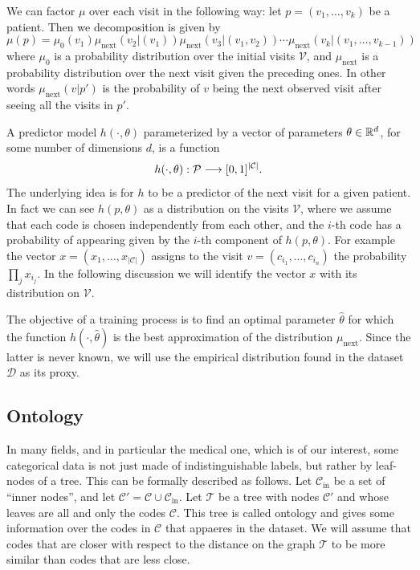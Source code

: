 \documentclass[]{marticle}
\newcommand{\ds}{\mathcal{D}}
\newcommand{\codes}{\mathcal{C}}
\newcommand{\codesin}{\mathcal{C}_\text{in}}
\newcommand{\tree }{\mathcal{T}}
\newcommand{\patients}{\mathcal{P}}
\newcommand{\visits}{\mathcal{V}}
\begin{document}
We can factor $\mu$ over each visit in the following way: let $p=(v_1, \dots, v_k)$ be a patient. Then
we decomposition is given by
$$ \mu(p) = \mu_0(v_1) \mu_\text{next} (v_2 | (v_1)) \mu_\text{next} (v_3 |
    (v_1, v_2)) \cdots \mu_\text{next} (v_k | (v_1, \dots, v_{k-1})) $$
where $\mu_0$ is a probability distribution over the initial visits $\visits$, and $\mu_\text{next}$ is a
probability distribution over the next visit given the preceding ones. In other words $\mu_\text{next} (v
| p')$ is the probability of $v$ being the next observed visit after seeing all the visits in $p'$.

A predictor model $h(\cdot, \theta)$ parameterized by a vector of parameters $\theta \in \mathbb{R}^d$, for some
number of dimensions $d$, is a function
$$ h(\cdot, \theta) : \patients \arr [0,1]^{|\codes|}. $$
The underlying idea is for $h$ to be a predictor of the next visit for a given patient. In fact we
can see $h(p, \theta)$ as a distribution on the visits $\visits$, where we assume that each code is
chosen independently from each other, and the $i$-th code has a probability of appearing given by
the $i$-th component of $h(p, \theta)$. For example the vector $x=(x_1, \dots, x_{|\codes|})$ assigns
to the visit $v=(c_{i_1}, \dots, c_{i_n})$ the probability $\prod_j x_{i_j}$. In the following
discussion we will identify the vector $x$ with its distribution on $\visits$.

The objective of a training process is to find an optimal parameter $\hat{\theta}$ for which the
function $h(\cdot, \hat{\theta})$ is the best approximation of the distribution $\mu_\text{next}$. Since the
latter is never known, we will use the empirical distribution found in the dataset $\ds$ as its proxy.

\subsection{Ontology} \label{sect-ontology}

In many fields, and in particular the medical one, which is of our interest, some categorical data
is not just made of indistinguishable labels, but rather by leaf-nodes of a tree. This can be
formally described as follows. Let $\codesin$ be a set of ``inner nodes'', and let $\codes' = \codes
\cup \codesin$. Let $\tree$ be a tree with nodes $\codes'$ and whose leaves are all and only the
codes $\codes$. This tree is called ontology and gives some information over the codes in $\codes$
that appaeres in the dataset. We will assume that codes that are closer with respect to the distance
on the graph $\tree$ to be more similar than codes that are less close.
\end{document}
